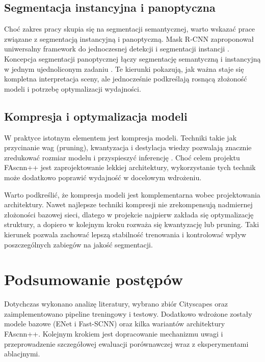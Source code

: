 \documentclass[12pt,oneside,a4paper]{report}
\begin{document}
\section{Segmentacja instancyjna i panoptyczna}
Choć zakres pracy skupia się na segmentacji semantycznej, warto wskazać prace
związane z segmentacją instancyjną i panoptyczną. Mask R-CNN zaproponował
uniwersalny framework do jednoczesnej detekcji i segmentacji instancji
\parencite{he2017maskrcnn}. Koncepcja segmentacji panoptycznej łączy segmentację
semantyczną i instancyjną w jednym ujednoliconym zadaniu
\parencite{kirillov2019panoptic}. Te kierunki pokazują, jak ważna staje się
kompletna interpretacja sceny, ale jednocześnie podkreślają rosnącą złożoność
modeli i potrzebę optymalizacji wydajności.

\section{Kompresja i optymalizacja modeli}
W praktyce istotnym elementem jest kompresja modeli. Techniki takie jak
przycinanie wag (pruning), kwantyzacja i destylacja wiedzy pozwalają znacznie
zredukować rozmiar modelu i przyspieszyć inferencję
\parencite{han2015deepcompression,jacob2018quantization,hinton2015distilling}.
Choć celem projektu FAscnn++ jest zaprojektowanie lekkiej architektury, wykorzystanie
tych technik może dodatkowo poprawić wydajność w docelowym wdrożeniu.

Warto podkreślić, że kompresja modeli jest komplementarna wobec projektowania
architektury. Nawet najlepsze techniki kompresji nie zrekompensują nadmiernej
złożoności bazowej sieci, dlatego w projekcie najpierw zakłada się optymalizację
struktury, a dopiero w kolejnym kroku rozważa się kwantyzację lub pruning.
Taki kierunek pozwala zachować lepszą stabilność trenowania i kontrolować wpływ
poszczególnych zabiegów na jakość segmentacji.

\chapter{Podsumowanie postępów}
Dotychczas wykonano analizę literatury, wybrano zbiór Cityscapes oraz
zaimplementowano pipeline treningowy i testowy. Dodatkowo wdrożone zostały
modele bazowe (ENet i Fast-SCNN) oraz kilka wariantów architektury FAscnn++.
Kolejnym krokiem jest dopracowanie mechanizmu uwagi i przeprowadzenie
szczegółowej ewaluacji porównawczej wraz z eksperymentami ablacjnymi.

\printbibliography
\end{document}
